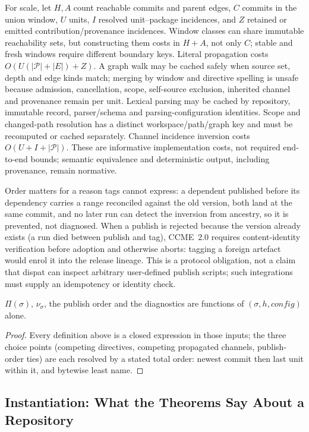 \documentclass[sigconf,nonacm]{acmart}
\begin{document}
For scale, let $H,A$ count reachable commits and parent edges, $C$ commits in
the union window, $U$ units, $I$ resolved unit--package incidences, and $Z$
retained or emitted contribution/provenance incidences. Window classes can
share immutable reachability sets, but constructing them costs in $H+A$, not
only $C$; stable and fresh windows require different boundary keys.
Literal propagation costs $O(U(|\mathcal P|+|E|)+Z)$. A graph walk may be
cached safely when source set, depth and edge kinds match; merging by window and
directive spelling is unsafe because admission, cancellation, scope,
self-source exclusion, inherited channel and provenance remain per unit.
Lexical parsing may be cached by repository, immutable record, parser/schema
and parsing-configuration identities. Scope and changed-path resolution has a
distinct workspace/path/graph key and must be recomputed or cached separately.
Channel incidence inversion costs $O(U+I+|\mathcal P|)$. These are informative
implementation costs, not required end-to-end bounds; semantic equivalence and
deterministic output, including provenance, remain normative. 

Order matters for a reason tags cannot express: a dependent published
before its dependency carries a range reconciled against the old
version, both land at the same commit, and no later run can detect the
inversion from ancestry, so it is prevented, not diagnosed. When a
publish is rejected because the version already exists (a run died
between publish and tag), CCME~2.0 requires content-identity verification
before adoption and otherwise aborts: tagging a foreign artefact would enrol
it into the release lineage. This is a protocol obligation, not a claim that
dispat can inspect arbitrary user-defined publish scripts; such integrations
must supply an idempotency or identity check.

\begin{theorem}[determinism]
\label{thm:det}
$\Pi(\sigma)$, $\nu_\sigma$, the publish order and the diagnostics are
functions of $(\sigma, h, \mathit{config})$ alone.
\end{theorem}
\begin{proof}
Every definition above is a closed expression in those inputs; the three
choice points (competing directives, competing propagated channels,
publish-order ties) are each resolved by a stated total order: newest
commit then last unit within it, and bytewise least name.
\end{proof}

\subsection{Instantiation: What the Theorems Say About a Repository}
\label{sec:model:inst}
\end{document}
